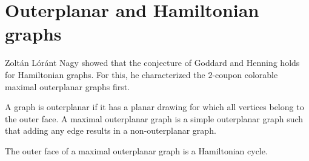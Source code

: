 \section{Outerplanar and Hamiltonian graphs}
Zoltán Lóránt Nagy \cite{outerplanar} showed that the conjecture of Goddard and Henning holds for
Hamiltonian graphs. For this, he characterized the $2$-coupon colorable
maximal outerplanar graphs first.

\begin{definition}
   A graph is outerplanar if it has a planar drawing for which all vertices
   belong to the outer face. A maximal outerplanar graph is a simple outerplanar graph
   such that adding any edge results in a non-outerplanar graph.
\end{definition}
\begin{remark}
  The outer face of a maximal outerplanar graph is a Hamiltonian cycle.
\end{remark}

